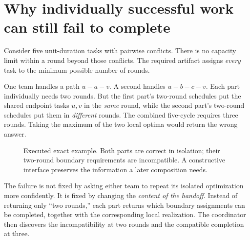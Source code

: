 \documentclass[11pt,letterpaper]{article}
\theoremstyle{definition}\newtheorem{definition}[theorem]{Definition}
\theoremstyle{remark}\newtheorem{remark}[theorem]{Remark}
\begin{document}
\section{Why individually successful work can still fail to complete}
\label{sec:paths}
Consider five unit-duration tasks with pairwise conflicts. There is no capacity limit within a round beyond those conflicts. The required artifact assigns \emph{every} task to the minimum possible number of rounds.

One team handles a path $u-a-v$. A second handles $u-b-c-v$. Each part individually needs two rounds. But the first part's two-round schedules put the shared endpoint tasks $u,v$ in the \emph{same} round, while the second part's two-round schedules put them in \emph{different} rounds. The combined five-cycle requires three rounds. Taking the maximum of the two local optima would return the wrong answer.

\begin{figure}[htbp]\centering
{}
\caption{Executed exact example. Both parts are correct in isolation; their two-round boundary requirements are incompatible. A constructive interface preserves the information a later composition needs.}
\label{fig:cycle}
\end{figure}

The failure is not fixed by asking either team to repeat its isolated optimization more confidently. It is fixed by changing the \emph{content of the handoff}. Instead of returning only ``two rounds,'' each part returns which boundary assignments can be completed, together with the corresponding local realization. The coordinator then discovers the incompatibility at two rounds and the compatible completion at three.
\end{document}
